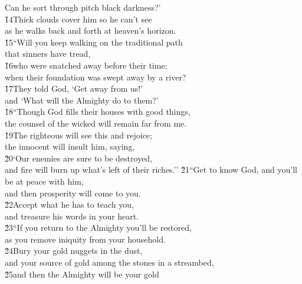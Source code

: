 \begin{poetry}
\poemll    Can he sort through pitch black darkness?' \\
\poeml \v{14}Thick clouds cover him so he can't see \\
\poemll    as he walks back and forth at heaven's horizon. \\
\poeml \v{15}``Will you keep walking on the traditional path \\
\poemll    that sinners have tread, \\
\poeml \v{16}who were snatched away before their time; \\
\poemll    when their foundation was swept away by a river? \\
\poeml \v{17}They told God, `Get away from us!' \\
\poemll    and `What will the Almighty do to them?' \\
\poeml \v{18}``Though God fills their houses with good things, \\
\poemll    the counsel of the wicked will remain far from me. \\
\poeml \v{19}The righteous will see this and rejoice; \\
\poemll    the innocent will insult him, saying, \\
\poeml \v{20}`Our enemies are sure to be destroyed, \\
\poemll    and fire will burn up what's left of their riches.''
\poeml \v{21}``Get to know God, and you'll be at peace with him, \\
\poemll    and then prosperity will come to you. \\
\poeml \v{22}Accept what he has to teach you, \\
\poemll    and treasure his words in your heart. \\
\poeml \v{23}``If you return to the Almighty you'll be restored, \\
\poemll    as you remove iniquity from your household. \\
\poeml \v{24}Bury your gold nuggets in the dust, \\
\poemll    and your source of gold among the stones in a streambed, \\
\poeml \v{25}and then the Almighty will be your gold \\

\end{poetry}
